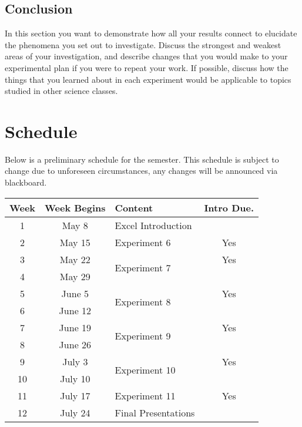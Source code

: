 \subsection*{Conclusion}
In this section you want to demonstrate how all your results connect to elucidate the phenomena you set out to investigate.
Discuss the strongest and weakest areas of your investigation, and describe changes that you would make to your experimental plan if you were to repeat your work.
If possible, discuss how the things that you learned about in each experiment would be applicable to topics studied in other science classes.

\newpage

\section*{Schedule}
Below is a preliminary schedule for the \semester{} semester.
This schedule is subject to change due to unforeseen circumstances, any changes will be announced via blackboard.
\begin{table}[h]
	\centering
	\begin{tabular}{ |c|c|l|c| } 
	 \hline
	 \textbf{Week} & \textbf{Week Begins} & \textbf{Content}  & \textbf{Intro Due.} \\ 
	 \hline
	 1 & May 8  & Excel Introduction & \\ 
	 \hline 
	 2 & May 15 & Experiment 6 & Yes \\ 
	 \hline 
	 3 & May 22 & \multirow{2}{*}{Experiment 7} & Yes \\ 
	 \cline{1-2} \cline{4-4}
	 4 & May 29 &  & \\ 
	 \hline
	 5 & June 5 & \multirow{2}{*}{Experiment 8} & Yes \\ 
	 \cline{1-2} \cline{4-4}
	 6 & June 12 &  &  \\ 
	 \hline
	 7 & June 19 & \multirow{2}{*}{Experiment 9} & Yes \\ 
	 \cline{1-2} \cline{4-4}
	 8 & June 26 &  &  \\ 
	 \hline
	 9 & July 3 & \multirow{2}{*}{Experiment 10} & Yes \\ 
	 \cline{1-2} \cline{4-4}
	 10 & July 10 &  &  \\ 
	 \hline
	 11 & July 17 & Experiment 11 & Yes \\ 
	 \hline
	 12 & July 24 & Final Presentations &  \\ 
	 \hline
	\end{tabular}
\end{table}

